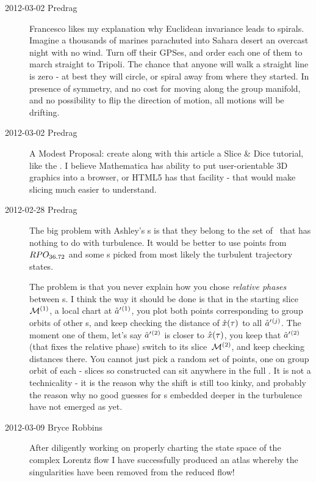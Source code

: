 \begin{description}
\item[2012-03-02 Predrag] Francesco likes my explanation why Euclidean
invariance leads to spirals. Imagine a thousands of marines parachuted
into Sahara desert an overcast night with no wind. Turn off their GPSes,
and order each one of them to march straight to Tripoli. The chance that
anyone will walk a straight line is zero - at best they will circle, or
spiral away from where they started. In presence of symmetry, and no cost
for moving along the group manifold, and no possibility to flip the
direction of motion, all motions will be drifting.

\item[2012-03-02 Predrag]
A Modest Proposal: create along with this article a Slice \& Dice
tutorial, like the . I believe Mathematica has ability to put user-orientable 3D
graphics into a browser, or HTML5 has that facility - that would make
slicing much easier to understand.

\item[2012-02-28 Predrag]
    The big problem with Ashley's %
    \template s
    is that they belong to the set of \reqva\ that has nothing to do with
    turbulence. It would be better to use points from $RPO_{36.72}$ and
    some \template s picked from most likely the turbulent trajectory
    states.

    The problem is that you never explain how you chose \emph{relative
    phases} between \template s. I think the way it should be done is
    that in the starting slice\ ${\cal M}{}^{(1)}$, a local chart at
    $\hat{a}'{}^{(1)}$, you plot both points corresponding to group orbits
    of other \template s, and keep checking the distance of
    $\hat{x}(\tau)$ to all $\hat{a}'{}^{(j)}$. The moment one of them,
    let's say $\hat{a}'{}^{(2)}$ is closer to $\hat{x}(\tau)$, you keep
    that $\hat{a}'{}^{(2)}$ (that fixes the relative phase) switch to its
    slice\ ${\cal M}{}^{(2)}$, and keep checking distances there. You cannot
    just pick a random set of points, one on group orbit of each
    {\template} - slices so constructed can sit anywhere in the full
    \statesp. It is not a technicality - it is the reason why the shift
    is still too kinky, and probably the reason why no good guesses for
    \rpo s embedded deeper in the turbulence have not emerged as yet.

\item[2012-03-09 Bryce Robbins]
After diligently working on properly charting the state space of the
complex Lorentz flow I have successfully produced an atlas whereby the
singularities have been removed from the reduced flow!


\end{description}
